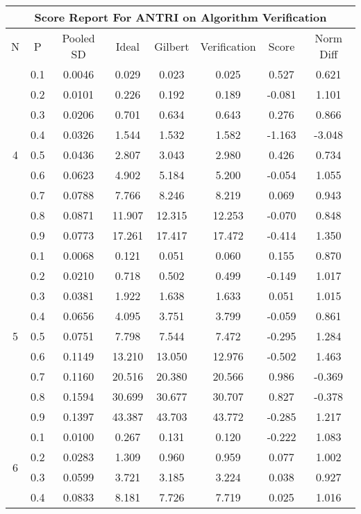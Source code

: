 \documentclass[11pt,a4paper]{report}
\begin{document}
\begin{longtable}{ | c | c || c | c | c | c | c | c | }
\hline
\multicolumn{8}{|c|}{ Score Report For ANTRI on Algorithm Verification} \\
\hline
N & P & Pooled SD &  Ideal &  Gilbert & Verification  & Score & Norm Diff \\
 \hline
 \hline
 \endhead
\multirow{9}{*}{4} & 0.1 & 0.0046 & 0.029 & 0.023 & 0.025 & 0.527 & 0.621 \\
 & 0.2 & 0.0101 & 0.226 & 0.192 & 0.189 & -0.081 & 1.101 \\
 & 0.3 & 0.0206 & 0.701 & 0.634 & 0.643 & 0.276 & 0.866 \\
 & 0.4 & 0.0326 & 1.544 & 1.532 & 1.582 & -1.163 & -3.048 \\
 & 0.5 & 0.0436 & 2.807 & 3.043 & 2.980 & 0.426 & 0.734 \\
 & 0.6 & 0.0623 & 4.902 & 5.184 & 5.200 & -0.054 & 1.055 \\
 & 0.7 & 0.0788 & 7.766 & 8.246 & 8.219 & 0.069 & 0.943 \\
 & 0.8 & 0.0871 & 11.907 & 12.315 & 12.253 & -0.070 & 0.848 \\
 & 0.9 & 0.0773 & 17.261 & 17.417 & 17.472 & -0.414 & 1.350 \\
 \hline
\multirow{9}{*}{5} & 0.1 & 0.0068 & 0.121 & 0.051 & 0.060 & 0.155 & 0.870 \\
 & 0.2 & 0.0210 & 0.718 & 0.502 & 0.499 & -0.149 & 1.017 \\
 & 0.3 & 0.0381 & 1.922 & 1.638 & 1.633 & 0.051 & 1.015 \\
 & 0.4 & 0.0656 & 4.095 & 3.751 & 3.799 & -0.059 & 0.861 \\
 & 0.5 & 0.0751 & 7.798 & 7.544 & 7.472 & -0.295 & 1.284 \\
 & 0.6 & 0.1149 & 13.210 & 13.050 & 12.976 & -0.502 & 1.463 \\
 & 0.7 & 0.1160 & 20.516 & 20.380 & 20.566 & 0.986 & -0.369 \\
 & 0.8 & 0.1594 & 30.699 & 30.677 & 30.707 & 0.827 & -0.378 \\
 & 0.9 & 0.1397 & 43.387 & 43.703 & 43.772 & -0.285 & 1.217 \\
 \hline
\multirow{9}{*}{6} & 0.1 & 0.0100 & 0.267 & 0.131 & 0.120 & -0.222 & 1.083 \\
 & 0.2 & 0.0283 & 1.309 & 0.960 & 0.959 & 0.077 & 1.002 \\
 & 0.3 & 0.0599 & 3.721 & 3.185 & 3.224 & 0.038 & 0.927 \\
 & 0.4 & 0.0833 & 8.181 & 7.726 & 7.719 & 0.025 & 1.016 \\

\end{longtable}
\end{document}
